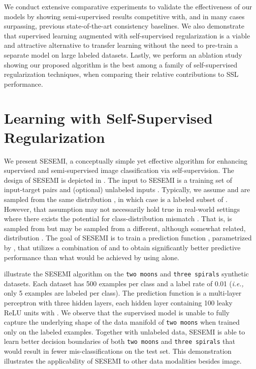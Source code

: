 \documentclass{article}
\begin{document}
We conduct extensive comparative experiments to validate the effectiveness of our models by showing semi-supervised results competitive with, and in many cases surpassing, previous state-of-the-art consistency baselines. We also demonstrate that supervised learning augmented with self-supervised regularization is a viable and attractive alternative to transfer learning without the need to pre-train a separate model on large labeled datasets. Lastly, we perform an ablation study showing our proposed algorithm is the best among a family of self-supervised regularization techniques, when comparing their relative contributions to SSL performance.

\section{Learning with Self-Supervised Regularization}
We present SESEMI, a conceptually simple yet effective algorithm for enhancing supervised and semi-supervised image classification via self-supervision. The design of SESEMI is depicted in . The input to SESEMI is a training set of input-target pairs  and (optional) unlabeled inputs . Typically, we assume  and  are sampled from the same distribution , in which case  is a labeled subset of . However, that assumption may not necessarily hold true in real-world settings where there exists the potential for class-distribution mismatch \cite{ssl-eval}. That is,  is sampled from  but  may be sampled from a different, although somewhat related, distribution . The goal of SESEMI is to train a prediction function , parametrized by , that utilizes a combination of  and  to obtain significantly better predictive performance than what would be achieved by using  alone.

 illustrate the SESEMI algorithm on the \texttt{two moons} and \texttt{three spirals} synthetic datasets. Each dataset has 500 examples per class and a label rate of 0.01 (\emph{i.e.,} only 5 examples are labeled per class). The prediction function  is a multi-layer perceptron with three hidden layers, each hidden layer containing 100 leaky ReLU units \cite{lrelu} with . We observe that the supervised model is unable to fully capture the underlying shape of the data manifold of \texttt{two moons} when trained only on the labeled examples. Together with unlabeled data, SESEMI is able to learn better decision boundaries of both \texttt{two moons} and \texttt{three spirals} that would result in fewer mis-classifications on the test set. This demonstration illustrates the applicability of SESEMI to other data modalities besides image.
\end{document}
